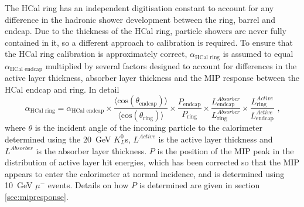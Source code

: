 The HCal ring has an independent digitisation constant to account for any difference in the hadronic shower development between the ring, barrel and endcap.  Due to the thickness of the HCal ring, particle showers are never fully contained in it, so a different approach to calibration is required.  To ensure that the HCal ring calibration is approximately correct, $\alpha_{\text{HCal ring}}$ is assumed to equal $\alpha_{\text{HCal endcap}}$ multiplied by several factors designed to account for differences in the active layer thickness, absorber layer thickness and the MIP response between the HCal endcap and ring.  In detail
%
\begin{equation}
\alpha_{\text{HCal ring}} = \alpha_{\text{HCal endcap}} \times \frac{\langle \text{cos}(\theta_\text{endcap}) \rangle}{\langle \text{cos}(\theta_\text{ring}) \rangle} \times \frac{P_\text{endcap} }{P_\text{ring} } \times \frac{L^{Absorber}_\text{endcap}}{L^{Absorber}_\text{ring} } \times \frac{L^{Active}_\text{ring}}{L^{Active}_\text{endcap}} \text{ ,}
\end{equation}
%
\noindent where $\theta$ is the incident angle of the incoming particle to the calorimeter determined using the 20~GeV $K^{0}_{L}$s, $L^{Active}$ is the active layer thickness and $L^{Absorber}$ is the absorber layer thickness.  $P$ is the position of the MIP peak in the distribution of active layer hit energies, which has been corrected so that the MIP appears to enter the calorimeter at normal incidence, and is determined using 10~GeV $\mu^{-}$ events.  Details on how $P$ is determined are given in section \ref{sec:mipresponse}.

